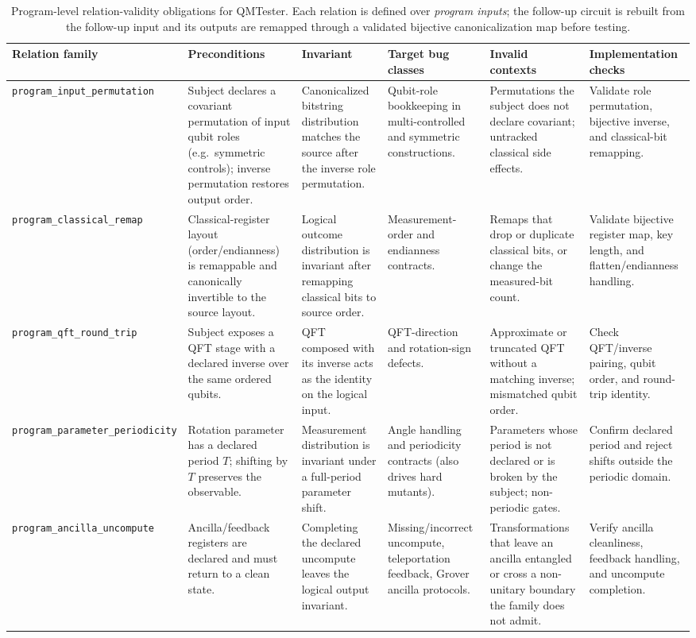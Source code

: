 \begin{table}[t]
\centering
\caption{Program-level relation-validity obligations for QMTester. Each relation is defined over \emph{program inputs}; the follow-up circuit is rebuilt from the follow-up input and its outputs are remapped through a validated bijective canonicalization map before testing.}
\label{tab:relation-validity}
\scriptsize
\setlength{\tabcolsep}{2.2pt}
\begin{tabular}{@{}p{}p{}p{}p{}p{}p{}@{}}
\toprule
\textbf{Relation family} & \textbf{Preconditions} & \textbf{Invariant} & \textbf{Target bug classes} & \textbf{Invalid contexts} & \textbf{Implementation checks} \\
\midrule
\texttt{program\_input\_permutation} & Subject declares a covariant permutation of input qubit roles (e.g.\ symmetric controls); inverse permutation restores output order. & Canonicalized bitstring distribution matches the source after the inverse role permutation. & Qubit-role bookkeeping in multi-controlled and symmetric constructions. & Permutations the subject does not declare covariant; untracked classical side effects. & Validate role permutation, bijective inverse, and classical-bit remapping. \\
\texttt{program\_classical\_remap} & Classical-register layout (order/endianness) is remappable and canonically invertible to the source layout. & Logical outcome distribution is invariant after remapping classical bits to source order. & Measurement-order and endianness contracts. & Remaps that drop or duplicate classical bits, or change the measured-bit count. & Validate bijective register map, key length, and flatten/endianness handling. \\
\texttt{program\_qft\_round\_trip} & Subject exposes a QFT stage with a declared inverse over the same ordered qubits. & QFT composed with its inverse acts as the identity on the logical input. & QFT-direction and rotation-sign defects. & Approximate or truncated QFT without a matching inverse; mismatched qubit order. & Check QFT/inverse pairing, qubit order, and round-trip identity. \\
\texttt{program\_parameter\_periodicity} & Rotation parameter has a declared period $T$; shifting by $T$ preserves the observable. & Measurement distribution is invariant under a full-period parameter shift. & Angle handling and periodicity contracts (also drives hard mutants). & Parameters whose period is not declared or is broken by the subject; non-periodic gates. & Confirm declared period and reject shifts outside the periodic domain. \\
\texttt{program\_ancilla\_uncompute} & Ancilla/feedback registers are declared and must return to a clean state. & Completing the declared uncompute leaves the logical output invariant. & Missing/incorrect uncompute, teleportation feedback, Grover ancilla protocols. & Transformations that leave an ancilla entangled or cross a non-unitary boundary the family does not admit. & Verify ancilla cleanliness, feedback handling, and uncompute completion. \\
\bottomrule
\end{tabular}
\end{table}
